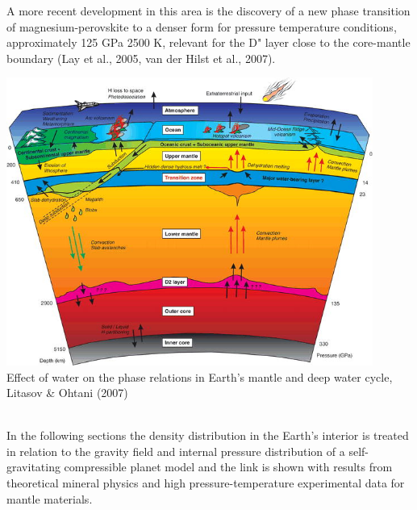 A more recent development in this area is the discovery of a new phase
transition of magnesium-perovskite to a denser form for pressure
temperature conditions, approximately 125 GPa 2500 K, relevant for the D"
layer close to the core-mantle boundary
(Lay et al., 2005, van der Hilst et al., 2007).

\begin{center}
\includegraphics[width=12cm]{images/gravity/effect}\\
{\captionfont Effect of water on the phase relations in Earth's mantle and deep water cycle,\\
Litasov \& Ohtani (2007) \cite{lioh07}} 
\end{center}


~\\
In the following sections the density distribution in the
Earth's interior is treated in relation to the gravity field
and internal pressure distribution of a self-gravitating compressible
planet model and the link is shown with results from theoretical
mineral physics and high pressure-temperature experimental data for
mantle materials.
